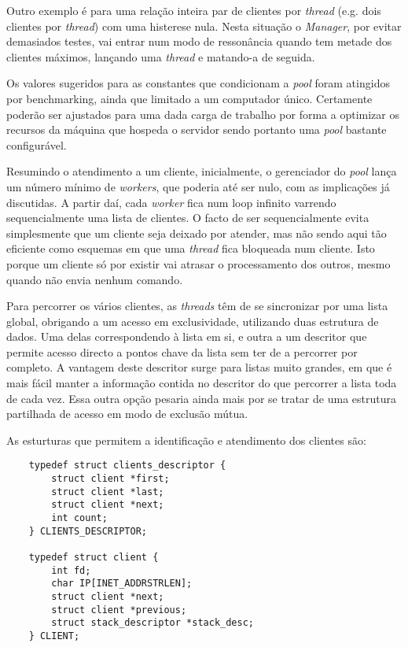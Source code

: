 	Outro exemplo é para uma relação inteira par de clientes por \emph{thread} (e.g. dois clientes por \emph{thread}) com uma histerese nula.
	Nesta situação o \emph{Manager}, por evitar demasiados testes, vai entrar num modo de ressonância quando tem metade dos clientes máximos, lançando uma \emph{thread} e matando-a de seguida.

	Os valores sugeridos para as constantes que condicionam a \emph{pool} foram atingidos por benchmarking, ainda que limitado a um computador único.
	Certamente poderão ser ajustados para uma dada carga de trabalho por forma a optimizar os recursos da máquina que hospeda o servidor sendo portanto uma \emph{pool} bastante configurável.

	\setlength{\parskip}{20pt}		%

	Resumindo o atendimento a um cliente, inicialmente, o gerenciador do \emph{pool} lança um número mínimo de \emph{workers}, que poderia até ser nulo, com as implicações já discutidas.
	A partir daí, cada \emph{worker} fica num loop infinito varrendo sequencialmente uma lista de clientes.
	O facto de ser sequencialmente evita simplesmente que um cliente seja deixado por atender, mas não sendo aqui tão eficiente como esquemas em que uma \emph{thread} fica bloqueada num cliente.
	Isto porque um cliente só por existir vai atrasar o processamento dos outros, mesmo quando não envia nenhum comando.
	
	\setlength{\parskip}{5pt}		%

	Para percorrer os vários clientes, as \emph{threads} têm de se sincronizar por uma lista global, obrigando a um acesso em exclusividade, utilizando duas estrutura de dados.
	Uma delas correspondendo à lista em si, e outra a um descritor que permite acesso directo a pontos chave da lista sem ter de a percorrer por completo.
	A vantagem deste descritor surge para listas muito grandes, em que é mais fácil manter a informação contida no descritor do que percorrer a lista toda de cada vez.
	Essa outra opção pesaria ainda mais por se tratar de uma estrutura partilhada de acesso em modo de exclusão mútua.

	As esturturas que permitem a identificação e atendimento dos clientes são:
	
	\begin{lstlisting}
	typedef struct clients_descriptor {
		struct client *first;
		struct client *last;
		struct client *next;
		int count;
	} CLIENTS_DESCRIPTOR;

	typedef struct client {
		int fd;
		char IP[INET_ADDRSTRLEN];
		struct client *next;
		struct client *previous;
		struct stack_descriptor *stack_desc;
	} CLIENT;
	\end{lstlisting}
	
